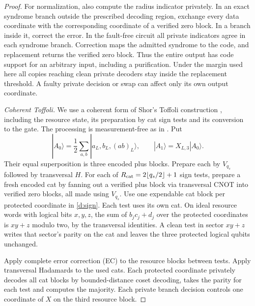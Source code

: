 \begin{proof}
For normalization, also compute the radius indicator privately.
In an exact syndrome branch outside the prescribed decoding region,
exchange every data coordinate with the corresponding coordinate of
a verified zero block. In a branch inside it, correct the error.
In the fault-free circuit all private indicators agree in each
syndrome branch. Correction maps the admitted syndrome to the code,
and replacement returns the verified zero block. Thus the entire
output has code support for an arbitrary input, including a
purification. Under the margin used here all copies reaching clean
private decoders stay inside the replacement threshold. A faulty
private decision or swap can affect only its own output coordinate.

\smallskip\noindent
\emph{Coherent Toffoli.}
We use a coherent form of Shor's Toffoli construction
\cite[Section~6]{Shor1996}, including the resource state, its preparation
by cat sign tests and its conversion to the gate. The processing is
measurement-free as in \cite{ABO2008}. Put
\[
 |A_0\rangle=\frac12\sum_{a,b}|a_L,b_L,(ab)_L\rangle,
 \qquad |A_1\rangle=X_{L,3}|A_0\rangle.
\]
Their equal superposition is three encoded plus blocks. Prepare each
by \(V_{q_s}\) followed by transversal \(H\). For each of
\(R_{\rm cat}=2\lfloor q_s/2\rfloor+1\) sign tests, prepare a fresh
encoded cat by fanning out a verified plus block via transversal CNOT
into verified zero blocks, all made using \(V_{q_s}\). Use one expendable
cat block per protected coordinate in \eqref{d:sign}. Each test uses
its own cat. On ideal resource words with logical bits \(x,y,z\),
the sum of \(b_jc_j+d_j\) over the protected coordinates is \(xy+z\)
modulo two, by the transversal identities. A clean test in sector
\(xy+z\) writes that sector's parity on the cat and leaves the three
protected logical qubits unchanged.

Apply complete error correction (EC) to the resource blocks between
tests. Apply transversal Hadamards to the used cats. Each protected
coordinate privately decodes all cat blocks by bounded-distance coset
decoding, takes the parity for each test and computes the majority.
Each private branch decision controls one coordinate of \(X\) on the
third resource block.


\end{proof}
